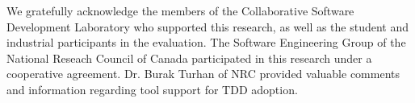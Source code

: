 \documentclass[smallextended]{svjour3}     %
\begin{document}
\begin{acknowledgements}
We gratefully acknowledge the members of the Collaborative Software 
Development Laboratory who supported this research, 
as well as the student and industrial participants in the evaluation.  
The Software Engineering Group of the National Reseach Council of Canada participated 
in this research
under a cooperative agreement. 
Dr. Burak Turhan of NRC provided valuable comments and information regarding
tool support for TDD adoption.

\end{acknowledgements}


\end{document}
